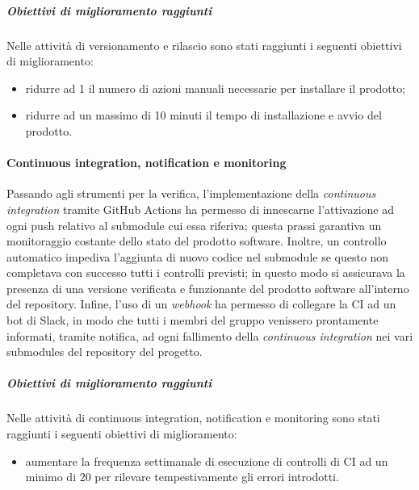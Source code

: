 				\subparagraph{Obiettivi di miglioramento raggiunti}
					Nelle attività di versionamento e rilascio sono stati raggiunti i seguenti obiettivi di miglioramento:
					\begin{itemize}
						\item ridurre ad 1 il numero di azioni manuali necessarie per installare il prodotto;
						\item ridurre ad un massimo di 10 minuti il tempo di installazione e avvio del prodotto.
					\end{itemize}
			
			\paragraph{Continuous integration, notification e monitoring}
				Passando agli strumenti per la verifica, l'implementazione della \textit{continuous integration} tramite GitHub Actions ha permesso di innescarne l'attivazione ad ogni push relativo al submodule cui essa riferiva; questa prassi garantiva un monitoraggio costante dello stato del prodotto software. Inoltre, un controllo automatico impediva l'aggiunta di nuovo codice nel submodule se questo non completava con successo tutti i controlli previsti; in questo modo si assicurava la presenza di una versione verificata e funzionante del prodotto software all'interno del repository. Infine, l'uso di un \textit{webhook} ha permesso di collegare la CI ad un bot di Slack, in modo che tutti i membri del gruppo venissero prontamente informati, tramite notifica, ad ogni fallimento della \textit{continuous integration} nei vari submodules del repository del progetto.
				
				\subparagraph{Obiettivi di miglioramento raggiunti}
					Nelle attività di continuous integration, notification e monitoring sono stati raggiunti i seguenti obiettivi di miglioramento:
					\begin{itemize}
						\item aumentare la frequenza settimanale di esecuzione di controlli di CI ad un minimo di 20 per rilevare tempestivamente gli errori introdotti.
					\end{itemize}

